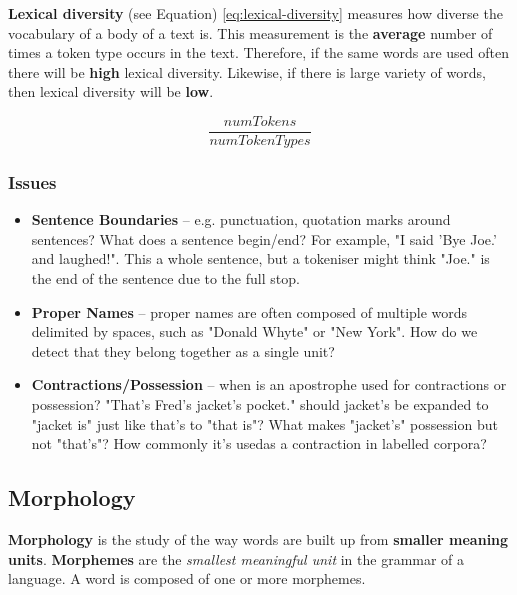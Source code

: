 \documentclass{article}
\begin{document}
\textbf{Lexical diversity} (see Equation) \ref{eq:lexical-diversity} measures how diverse the vocabulary of a body of a text is. This measurement is the \textbf{average} number of times a token type occurs in the text. Therefore, if the same words are used often there will be \textbf{high} lexical diversity. Likewise, if there is large variety of words, then lexical diversity will be \textbf{low}.

\begin{equation}
	\frac{numTokens}{numTokenTypes}
	\label{eq:lexical-diversity}
\end{equation}

\subsubsection{Issues}

\begin{itemize}
	\item \textbf{Sentence Boundaries} -- e.g. punctuation, quotation marks around sentences? What does a sentence begin/end? For example, "I said 'Bye Joe.' and laughed!". This a whole sentence, but a tokeniser might think "Joe." is the end of the sentence due to the full stop.
	\item \textbf{Proper Names} -- proper names are often composed of multiple words delimited by spaces, such as "Donald Whyte" or "New York". How do we detect that they belong together as a single unit?
	\item \textbf{Contractions/Possession} -- when is an apostrophe used for contractions or possession? "That’s Fred’s jacket’s pocket." should jacket's be expanded to "jacket is" just like that's to "that is"? What makes "jacket's" possession but not "that's"? How commonly it's usedas a contraction in labelled corpora?
\end{itemize}

\subsection{Morphology}

\textbf{Morphology} is the study of the way words are built up from \textbf{smaller meaning units}. \textbf{Morphemes} are the \textit{smallest meaningful unit} in the grammar of a language. A word is composed of one or more morphemes.
\end{document}
